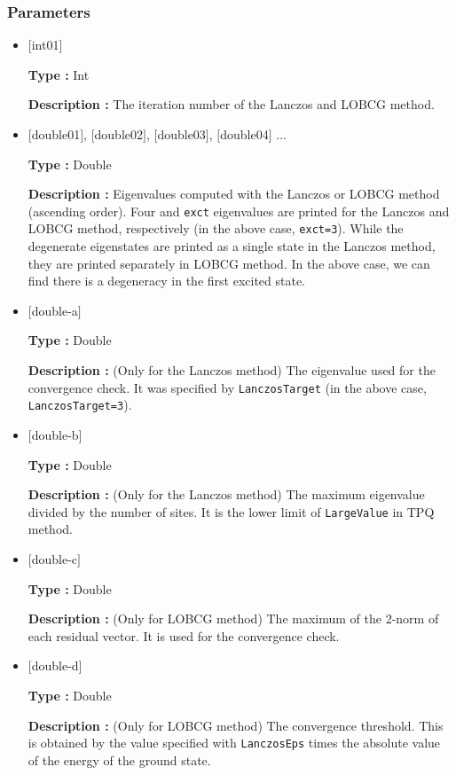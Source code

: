 \subsubsection{Parameters}

\begin{itemize}

\item  $[$int01$]$
  
 {\bf Type :} Int

 {\bf Description :} The iteration number of the Lanczos and LOBCG method.
 
\item  $[$double01$]$, $[$double02$]$, $[$double03$]$, $[$double04$]$ ...

  {\bf Type :} Double 
  
  {\bf Description :}
  Eigenvalues computed with the Lanczos or LOBCG method (ascending order).
  Four and \verb|exct| eigenvalues are printed for the Lanczos and LOBCG method, respectively
  (in the above case, \verb|exct=3|).
  While the degenerate eigenstates are printed as a single state in the Lanczos method,
  they are printed separately in LOBCG method.
  In the above case, we can find there is a degeneracy
  in the first excited state.

\item $[$double-a$]$

  {\bf Type :} Double 
  
  {\bf Description :} (Only for the Lanczos method)
  The eigenvalue used for the convergence check.
  It was specified by \verb|LanczosTarget|
  (in the above case, \verb|LanczosTarget=3|).

\item $[$double-b$]$

  {\bf Type :} Double 
  
  {\bf Description :} (Only for the Lanczos method)
  The maximum eigenvalue divided by the number of sites.
  It is the lower limit of \verb|LargeValue| in TPQ method.

\item $[$double-c$]$

  {\bf Type :} Double 
  
  {\bf Description :} (Only for LOBCG method)
  The maximum of the 2-norm of each residual vector.
  It is used for the convergence check.

\item $[$double-d$]$

  {\bf Type :} Double 
  
  {\bf Description :} (Only for LOBCG method)
  The convergence threshold.
  This is obtained by the value specified with \verb|LanczosEps|
  times the absolute value of the energy of the ground state.

\end{itemize}

